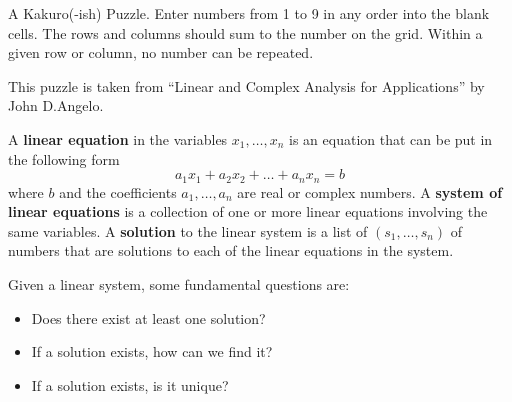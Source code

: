 \documentclass[12pt,letterpaper]{article}
\begin{document}
\thispagestyle{fancy}

\begin{enumerate}
  \Problem A Kakuro(-ish) Puzzle. Enter numbers from 1 to 9 in any order into the blank cells. The rows and columns should sum to the number on the grid. Within a given row or column, no number can be repeated.
  
  \begin{center}
  	\begin{kakuro}
\end{kakuro}
  
  \end{center}
This puzzle is taken from ``Linear and Complex Analysis for Applications'' by John D.Angelo.


\newpage

\begin{defn}
A {\bf linear equation} in the variables $x_1, \dots, x_n$ is an equation that can be put in the following form
\begin{equation*}
a_1 x_1 +a_2 x_2 +\dots + a_n x_n =b
\end{equation*}
where $b$ and the coefficients $a_1,\dots, a_n$ are real or complex numbers. A {\bf system of linear equations} is a collection of one or more linear equations involving the same variables. A {\bf solution} to the linear system is a list of $(s_1, \dots, s_n)$ of numbers that are solutions to each of the linear equations in the system. 
\end{defn}

Given a linear system, some fundamental questions are:
\begin{itemize}
\item Does there exist at least one solution?
\item If a solution exists, how can we find it?
\item If a solution exists, is it unique?
\end{itemize}


\end{enumerate}
\end{document}
